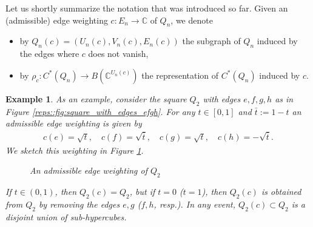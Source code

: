 \documentclass[a4paper]{amsart}
\newcommand{\C}{\mathbb{C}}
\newtheorem{example}[thm]{Example}
\begin{document}
Let us shortly summarize the notation that was introduced so far. Given an (admissible) edge weighting $c: E_n \to \C$ of $Q_n$, we denote
\begin{itemize}
    \item by $Q_n(c) = (U_n(c), V_n(c), E_n(c))$ the subgraph of $Q_n$ induced by the edges where $c$ does not vanish,
    \item by $\rho_c: C^\ast(Q_n) \to B(\C^{U_n(c)})$ the representation of $C^\ast(Q_n)$ induced by $c$.
\end{itemize}

\begin{example}
    \label{reps::ex:admissible_weighting_example}
    As an example, consider the square $Q_2$ with edges $e, f, g, h$ as in Figure \ref{reps::fig:square_with_edges_efgh}. For any $t \in [0,1]$ and $\bar{t} := 1-t$ an admissible edge weighting is given by
    \begin{align*}
        c(e) = \sqrt{t}, \quad c(f) = \sqrt{\bar{t}}, \quad c(g) = \sqrt{t}, \quad c(h) = -\sqrt{\bar{t}}.
    \end{align*}
    We sketch this weighting in Figure \ref{reps::fig:admissible_weighting_example}.
    \begin{figure}[ht]
        \caption{An admissible edge weighting of $Q_2$}
        \label{reps::fig:admissible_weighting_example}
    \end{figure}
    If $t \in (0,1)$, then $Q_2(c) = Q_2$, but if $t =0$ ($t=1$), then $Q_2(c)$ is obtained from $Q_2$ by removing the edges $e,g$ ($f,h$, resp.). In any event, $Q_2(c) \subset Q_2$ is a disjoint union of sub-hypercubes. 
    

\end{example}
\end{document}
